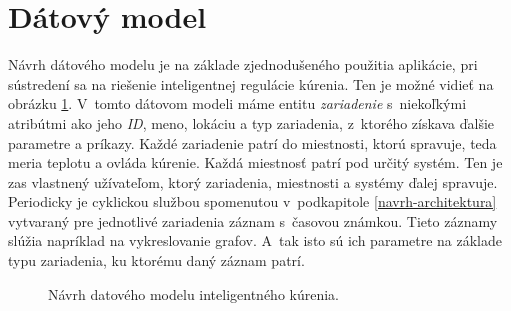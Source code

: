 \section{Dátový model}\label{navrh-datamodel}
Návrh dátového modelu je na základe zjednodušeného použitia aplikácie, pri sústredení sa na riešenie inteligentnej regulácie kúrenia. Ten je možné vidieť na obrázku \ref{fig:designedModel}.
V~tomto dátovom modeli máme entitu \emph{zariadenie} s~niekoľkými atribútmi ako jeho \emph{ID}, meno, lokáciu a typ zariadenia, z~ktorého získava ďalšie parametre a príkazy. 
Každé zariadenie patrí do miestnosti, ktorú spravuje, teda meria teplotu a ovláda kúrenie. Každá miestnosť patrí pod určitý systém. 
Ten je zas vlastnený užívateľom, ktorý zariadenia, miestnosti a systémy ďalej spravuje. 
Periodicky je cyklickou službou spomenutou v~podkapitole \ref{navrh-architektura} vytvaraný pre jednotlivé zariadenia záznam s~časovou známkou. 
Tieto záznamy slúžia napríklad na vykreslovanie grafov. 
A~tak isto sú ich parametre na základe typu zariadenia, ku ktorému daný záznam patrí.
\begin{figure}[h!]
    \centering
    
    \caption{Návrh datového modelu inteligentného kúrenia.}
    \label{fig:designedModel}
\end{figure}
